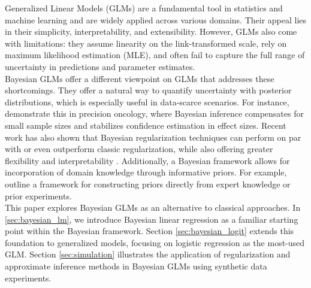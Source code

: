 Generalized Linear Models (GLMs) are a fundamental tool in statistics and machine learning and are widely applied across various domains.
Their appeal lies in their simplicity, interpretability, and extensibility.
However, GLMs also come with limitations:
they assume linearity on the link-transformed scale, rely on maximum likelihood estimation (MLE), and often fail to capture the full range of uncertainty in predictions and parameter estimates.\\

Bayesian GLMs offer a different viewpoint on GLMs that addresses these shortcomings.
They offer a natural way to quantify uncertainty with posterior distributions, which is especially useful in data-scarce scenarios.
For instance, \citet{sondhi_bayesian_2021} demonstrate this in precision oncology, where Bayesian inference compensates for small sample sizes and stabilizes confidence estimation in effect sizes.
Recent work has also shown that Bayesian regularization techniques can perform on par with or even outperform classic regularization, while also offering greater flexibility and interpretability \citep[see e.g.][]{van_erp_shrinkage_2019,celeux_regularization_2012}.
Additionally, a Bayesian framework allows for incorporation of domain knowledge through informative priors.
For example, \citet{chien_informative_2023} outline a framework for constructing priors directly from expert knowledge or prior experiments.\\

This paper explores Bayesian GLMs as an alternative to classical approaches.
In \autoref{sec:bayesian_lm}, we introduce Bayesian linear regression as a familiar starting point within the Bayesian framework.
Section \ref{sec:bayesian_logit} extends this foundation to generalized models, focusing on logistic regression as the most-used GLM.
Section \ref{sec:simulation} illustrates the application of regularization and approximate inference methods in Bayesian GLMs using synthetic data experiments.\\



